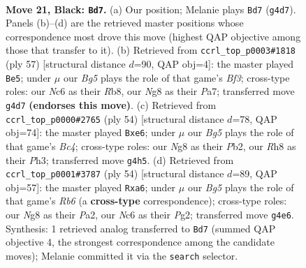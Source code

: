 \documentclass[11pt]{article}
\begin{document}
\clearpage

\begin{figure}[p]\centering
\begin{subfigure}{0.46\textwidth}\centering
\resizebox{\linewidth}{!}{%
\newchessgame
\chessboard[
  setfen={4k1nr/5ppp/2n5/1B2P2P/P5b1/5NK1/1r4P1/RN5R b k - 3 21},
  showmover=false,
  pgfstyle=straightmove, color=movearrow, markmove={g4-d7}
]}
\caption{}
\end{subfigure}\hfill
\begin{subfigure}{0.46\textwidth}\centering
\resizebox{\linewidth}{!}{%
\newchessgame
\chessboard[
  setfen={1r6/p5p1/5b2/3p3p/n3kN1P/6P1/PP3P2/1RB3K1 b - - 4 29},
  showmover=false,
  pgfstyle=straightmove, color=movearrow, markmove={f6-e5}
]}
\caption{}
\end{subfigure}
\\[4pt]
\begin{subfigure}{0.46\textwidth}\centering
\resizebox{\linewidth}{!}{%
\newchessgame
\chessboard[
  setfen={8/1k3pr1/p1nRbr2/p1p5/2B1PN2/7P/1P3K2/2R5 w - - 4 28},
  showmover=false,
  pgfstyle=straightmove, color=movearrow, markmove={c4-e6}
]}
\caption{}
\end{subfigure}\hfill
\begin{subfigure}{0.46\textwidth}\centering
\resizebox{\linewidth}{!}{%
\newchessgame
\chessboard[
  setfen={7r/2rn1pkp/pRbNp1p1/2P5/8/3B1P2/P3K1PP/2R5 w - - 5 28},
  showmover=false,
  pgfstyle=straightmove, color=movearrow, markmove={b6-a6}
]}
\caption{}
\end{subfigure}
\caption{\textbf{Move 21, Black: \texttt{Bd7}.} (a) Our position; Melanie plays \texttt{Bd7} (\texttt{g4d7}). Panels (b)--(d) are the retrieved master positions whose correspondence most drove this move (highest QAP objective among those that transfer to it). (b) Retrieved from \texttt{ccrl\_top\_p0003\#1818} (ply 57) [structural distance $d$=90, QAP obj=4]: the master played \texttt{Be5}; under $\mu$ our \emph{Bg5} plays the role of that game's \emph{Bf3}; cross-type roles: our \emph{N}c6 as their \emph{R}b8, our \emph{N}g8 as their \emph{P}a7; transferred move \texttt{g4d7} \textbf{(endorses this move)}. (c) Retrieved from \texttt{ccrl\_top\_p0000\#2765} (ply 54) [structural distance $d$=78, QAP obj=74]: the master played \texttt{Bxe6}; under $\mu$ our \emph{Bg5} plays the role of that game's \emph{Bc4}; cross-type roles: our \emph{N}g8 as their \emph{P}b2, our \emph{R}h8 as their \emph{P}h3; transferred move \texttt{g4h5}. (d) Retrieved from \texttt{ccrl\_top\_p0001\#3787} (ply 54) [structural distance $d$=89, QAP obj=57]: the master played \texttt{Rxa6}; under $\mu$ our \emph{Bg5} plays the role of that game's \emph{Rb6} (a \textbf{cross-type} correspondence); cross-type roles: our \emph{N}g8 as their \emph{P}a2, our \emph{N}c6 as their \emph{P}g2; transferred move \texttt{g4e6}. Synthesis: 1 retrieved analog transferred to \texttt{Bd7} (summed QAP objective 4, the strongest correspondence among the candidate moves); Melanie committed it via the \texttt{search} selector.}
\label{fig:thought-m41}
\end{figure}
\end{document}
